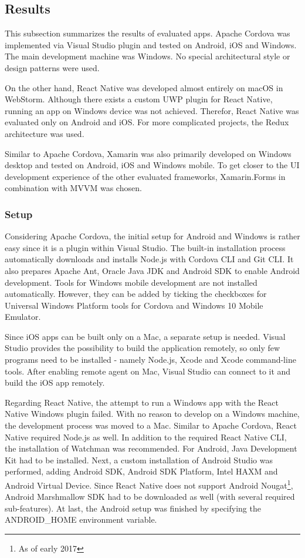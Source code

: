 \documentclass[english,master,public,dept460,male,cpdeclaration,oneside]{diploma}
\begin{document}
\subsection{Results}

This subsection summarizes the results of evaluated apps. Apache Cordova was implemented via Visual Studio plugin and tested on Android, iOS and Windows. The main development machine was Windows. No special architectural style or design patterns were used.

On the other hand, React Native was developed almost entirely on macOS in WebStorm. Although there exists a custom UWP plugin for React Native, running an app on Windows device was not achieved. Therefor, React Native was evaluated only on Android and iOS. For more complicated projects, the Redux architecture was used. 

Similar to Apache Cordova, Xamarin was also primarily developed on Windows desktop and tested on Android, iOS and Windows mobile. To get closer to the UI development experience of the other evaluated frameworks, Xamarin.Forms in combination with MVVM was chosen.

\subsubsection{Setup}
Considering Apache Cordova, the initial setup for Android and Windows is rather easy since it is a plugin within Visual Studio. The built-in installation process automatically downloads and installs Node.js with Cordova CLI and Git CLI. It also prepares Apache Ant, Oracle Java JDK and Android SDK to enable Android development. Tools for Windows mobile development are not installed automatically. However, they can be added by ticking the checkboxes for Universal Windows Platform tools for Cordova and Windows 10 Mobile Emulator. 

Since iOS apps can be built only on a Mac, a separate setup is needed. Visual Studio provides the possibility to build the application remotely, so only few programs need to be installed - namely Node.js, Xcode and Xcode command-line tools. After enabling remote agent on Mac, Visual Studio can connect to it and build the iOS app remotely.

Regarding React Native, the attempt to run a Windows app with the React Native Windows plugin failed. With no reason to develop on a Windows machine, the development process was moved to a Mac. Similar to Apache Cordova, React Native required Node.js as well. In addition to the required React Native CLI, the installation of Watchman was recommended. For Android, Java Development Kit had to be installed. Next, a custom installation of Android Studio was performed, adding Android SDK, Android SDK Platform, Intel HAXM and Android Virtual Device. Since React Native does not support Android Nougat\footnote{As of early 2017}, Android Marshmallow SDK had to be downloaded as well (with several required sub-features). At last, the Android setup was finished by specifying the ANDROID\_HOME environment variable.
\end{document}

